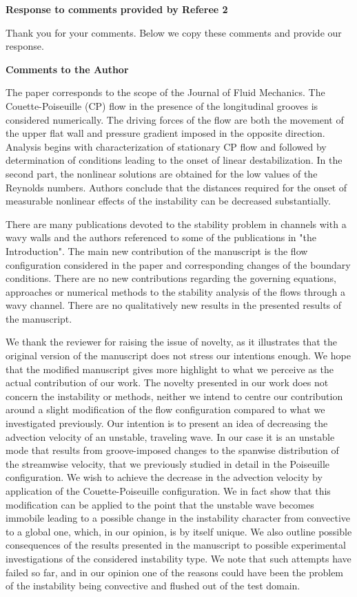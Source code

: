 \documentclass[a4paper,12pt]{article}
\begin{document}
{\bf Response to comments provided by Referee 2}

Thank you for your comments. Below we copy these comments and provide our response. 

\vspace*{50pt}


{\bf Comments to the Author 

The paper corresponds to the scope of the Journal of Fluid Mechanics. The Couette-Poiseuille (CP) flow in the presence of the longitudinal grooves is considered numerically. The driving forces of the  flow are both the movement of the upper flat wall and pressure gradient imposed in the opposite direction. Analysis begins with characterization of stationary CP flow and followed by determination of conditions leading to the onset of linear destabilization. In the second part, the nonlinear solutions are obtained for the low values of the Reynolds numbers. Authors conclude that the distances required for the onset of measurable nonlinear effects of the instability can be decreased substantially. 

There are many publications devoted to the stability problem in channels with a wavy walls and the authors referenced to some of the publications in "the Introduction". The main new contribution of the manuscript is the flow configuration considered in the paper and corresponding changes of the boundary conditions. There are no new contributions regarding the governing equations, approaches or numerical methods to the stability analysis of the flows through a wavy channel. There are no qualitatively new results in the presented results of the manuscript.}

\vspace*{20pt}
We thank the reviewer for raising the issue of novelty, as it illustrates that the original version of the manuscript does not stress our intentions enough. We hope that the modified manuscript gives more highlight to what we perceive as the actual contribution of our work. The novelty presented in our work does not concern the instability or methods, neither we intend to centre our contribution around a slight modification of the flow configuration compared to what we investigated previously. Our intention is to present an idea of decreasing the advection velocity of an unstable, traveling wave. In our case it is an unstable mode that results from groove-imposed changes to the spanwise distribution of the streamwise velocity, that we previously studied in detail in the Poiseuille configuration. We wish to achieve the decrease in the advection velocity by application of the Couette-Poiseuille configuration. We in fact show that this modification can be applied to the point that the unstable wave becomes immobile leading to a possible change in the instability character from convective to a global one, which, in our opinion, is by itself unique. We also outline possible consequences of the results presented in the manuscript to possible experimental investigations of the considered instability type. We note that such attempts have failed so far, and in our opinion one of the reasons could have been the problem of the instability being convective and flushed out of the test domain. 
\end{document}
